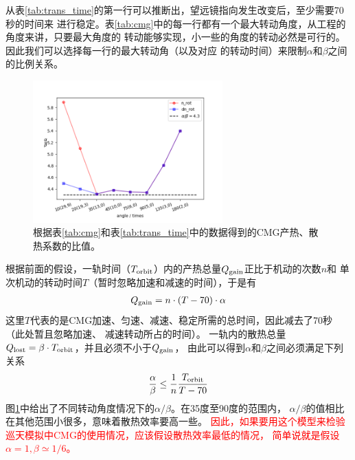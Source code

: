 \documentclass[a4paper,11pt]{ctexart}
\newcommand{\RT}[1]{\textcolor{red}{#1}}
\begin{document}
从表\ref{tab:trans_time}的第一行可以推断出，望远镜指向发生改变后，至少需要70秒的时间来
进行稳定。表\ref{tab:cmg}中的每一行都有一个最大转动角度，从工程的角度来讲，只要最大角度的
转动能够实现，小一些的角度的转动必然是可行的。因此我们可以选择每一行的最大转动角（以及对应
的转动时间）来限制$\alpha$和$\beta$之间的比例关系。

\begin{figure}[h!]
\centering
\includegraphics[width=0.65\textwidth]{figures/CMG_alpha2beta.png}
\caption{根据表\ref{tab:cmg}和表\ref{tab:trans_time}中的数据得到的CMG产热、散热系数的比值。}
\label{fig:cmg_alpha_beta}
\end{figure}

根据前面的假设，一轨时间（$T_{\rm orbit}$）内的产热总量$Q_{\rm gain}$正比于机动的次数$n$和
单次机动的转动时间$T$（暂时忽略加速和减速的时间），于是有
\begin{eqnarray}
Q_{\rm gain} = n\cdot (T-70)\cdot \alpha
\end{eqnarray}
这里$T$代表的是CMG加速、匀速、减速、稳定所需的总时间，因此减去了70秒（此处暂且忽略加速、
减速转动所占的时间）。
一轨内的散热总量$Q_{\rm lost}=\beta\cdot T_{\rm orbit}$，并且必须不小于$Q_{\rm gain}$，
由此可以得到$\alpha$和$\beta$之间必须满足下列关系
\begin{eqnarray}
\frac{\alpha}{\beta} \le \frac{1}{n} \frac{T_{\rm orbit}}{T-70}
\end{eqnarray}
图\ref{fig:cmg_alpha_beta}中给出了不同转动角度情况下的$\alpha / \beta$。在35度至90度的范围内，
$\alpha / \beta$的值相比在其他范围小很多，意味着散热效率要高一些。
\RT{\heiti 因此，如果要用这个模型来检验巡天模拟中CMG的使用情况，应该假设散热效率最低的情况，
简单说就是假设$\alpha=1,\beta\simeq 1/6$。}
\end{document}
